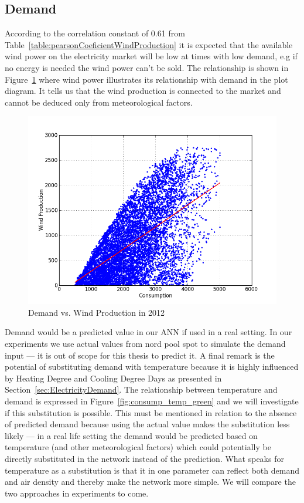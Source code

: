 \subsection{Demand}
\label{sec:demandWindProduction}
According to the correlation constant of 0.61 from Table~\ref{table:pearsonCoeficientWindProduction} it is expected that the available wind power on the electricity market will be low at times with low demand, e.g if no energy is needed the wind power can't be sold.  The relationship is shown in Figure~\ref{fig:demandVsWindProduction} where wind power illustrates its relationship with demand in the plot diagram. It tells us that the wind production is connected to the market and cannot be deduced only from meteorological factors.

\begin{figure}[H]
\centering
\includegraphics[width=0.99\linewidth,natwidth=898,natheight=587]{billeder/consumptionVsWindProduction.png}
\caption{Demand vs. Wind Production in 2012}
\label{fig:demandVsWindProduction}
\end{figure}

\noindent Demand would be a predicted value in our ANN if used in a real setting. In our experiments we use actual values from nord pool spot to simulate the demand input --- it is out of scope for this thesis to predict it. A final remark is the potential of substituting demand with temperature because it is highly influenced by Heating Degree and Cooling Degree Days as presented in Section~\ref{sec:ElectricityDemand}. The relationship between temperature and demand is expressed in Figure~\ref{fig:consump_temp_green} and we will investigate if this substitution is possible. This must be mentioned in relation to the absence of predicted demand because using the actual value makes the substitution less likely --- in a real life setting the demand would be predicted based on temperature (and other meteorological factors) which could potentially be directly substituted in the network instead of the prediction. What speaks for temperature as a substitution is that it in one parameter can reflect both demand and air density and thereby make the network more simple. We will compare the two approaches in experiments to come. 

